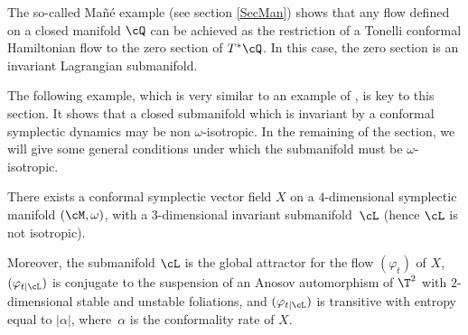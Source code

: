 The so-called Mañé example \cite{Man1992} (see section \ref{SecMan}) shows that any flow defined on a closed manifold $\cQ$ can be achieved as the restriction of a Tonelli conformal
Hamiltonian flow to the zero section of $T^*\cQ$. In this case, the zero section is an invariant Lagrangian submanifold.

The following example, which is very similar to an example of \cite{Geiges1995}, is key to this section. It shows that a closed submanifold which is invariant by a conformal symplectic dynamics may be non $\omega$-isotropic. In the remaining of the section, we will give some general conditions under which the submanifold must be $\omega$-isotropic.

\begin{proposition}\label{Pflownonisotrop}
There exists a conformal symplectic vector field $X$ on a $4$\nobreakdash-dimen\-sional symplectic manifold $({\cM}, \omega)$, with a $3$\nobreakdash-dimensional invariant submani\-fold~${\cL}$ (hence ${\cL}$ is not isotropic).

Moreover, the submanifold ${\cL}$ is the global attractor for the flow $(\varphi_t)$ of $X$, $(\varphi_{t|\cL})$ is conjugate to the suspension of an Anosov automorphism of $\T^2$ with $2$\nobreakdash-dimensional stable and unstable foliations, and $(\varphi_{t|\cL})$ is transitive with entropy equal to $|\alpha|$, where~$\alpha$ is the conformality rate of $X$.
\end{proposition}

